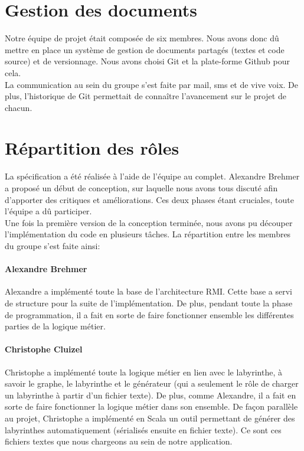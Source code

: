 \section{Gestion des documents}
    Notre équipe de projet était composée de six membres. Nous avons donc dû mettre en place un système de gestion de documents partagés (textes et code source) et de versionnage. Nous avons choisi Git et la plate-forme Github pour cela. \\

    La communication au sein du groupe s'est faite par mail, sms et de vive voix. De plus, l'historique de Git permettait de connaître l'avancement sur le projet de chacun.


\section{Répartition des rôles}
    La spécification a été réalisée à l'aide de l'équipe au complet. Alexandre Brehmer a proposé un début de conception, sur laquelle nous avons tous discuté afin d'apporter des critiques et améliorations. Ces deux phases étant cruciales, toute l'équipe a dû participer. \\

    Une fois la première version de la conception terminée, nous avons pu découper l'implémentation du code en plusieurs tâches. La répartition entre les membres du groupe s'est faite ainsi:

    \paragraph{Alexandre Brehmer} Alexandre a implémenté toute la base de l'architecture RMI\@. Cette base a servi de structure pour la suite de l'implémentation. De plus, pendant toute la phase de programmation, il a fait en sorte de faire fonctionner ensemble les différentes parties de la logique métier.

    \paragraph{Christophe Cluizel} Christophe a implémenté toute la logique métier en lien avec le labyrinthe, à savoir le graphe, le labyrinthe et le générateur (qui a seulement le rôle de charger un labyrinthe à partir d'un fichier texte). De plus, comme Alexandre, il a fait en sorte de faire fonctionner la logique métier dans son ensemble. De façon parallèle au projet, Christophe a implémenté en Scala un outil permettant de générer des labyrinthes automatiquement (sérialisés ensuite en fichier texte). Ce sont ces fichiers textes que nous chargeons au sein de notre application.

